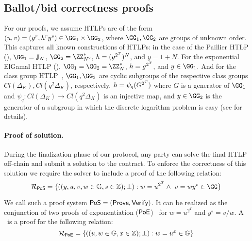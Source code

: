 \subsection{Ballot/bid correctness proofs}\label{sec:sigmas}

For our proofs, we assume HTLPs are of the form $(u,v) = (g^r, h^r y^s) \in \GG_1 \times \GG_2$, where $\GG_1, \GG_2$ are groups of unknown order. 
This captures all known constructions of HTLPs: in the case of the Paillier HTLP (), $\GG_1 = \mathbb{J}_N$, $\GG_2 = \ZZ_{N^2}^*$, $h = (g^{2^{T}})^N$, and $y = 1+N$. For the exponential ElGamal HTLP (), $\GG_1 = \GG_2 = \ZZ_N^*$, $h = g^{2^{T}}$, and $y \in \GG_1$. And for the class group HTLP~\cite{CCS:TCLM21}, $\GG_1,\GG_2$ are cyclic subgroups of the respective class groups $Cl(\Delta_K), Cl(q^2\Delta_K)$, respectively, $h = \psi_q(G^{2^{T}})$ where $G$ is a generator of $\GG_1$ and $\psi_q : Cl(\Delta_K) \to Cl(q^2 \Delta_K)$ is an injective map, and $y \in \GG_2$ is the generator of a subgroup in which the discrete logarithm problem is easy (see \cite{CCS:TCLM21} for details).

\paragraph{Proof of solution.}


% 

During the finalization phase of our protocol, any party can solve the final HTLP off-chain and submit a solution to the contract. To enforce the correctness of this solution we require the solver to include a proof of the following relation:
\begin{equation}
    \mathcal{R}_{\pos}=\{((y,u,v,w\in\mathbb{G},s\in\mathbb{Z});\bot): w = u^{2^\Ttime} \land\ v = w y^s \in \GG\}
\end{equation}

We call such a proof system ${\sf PoS} = (\mathsf{Prove}, \mathsf{Verify})$. It can be realized as the conjunction of two proofs of exponentiation ($\mathsf{PoE}$)~\cite{ITCS:Pietrzak19b,EC:Wesolowski19} for $w = u^{2^T}$ and $y^s = v/w$.
A \poe\ is a proof for the following relation:
\[
    \mathcal{R}_{\mathsf{PoE}}=\{((u,w\in\mathbb{G},x\in\mathbb{Z});\bot):w=u^{x}\in\mathbb{G}\}
\]

